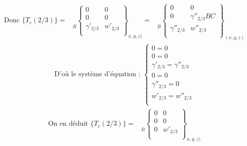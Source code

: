 \documentclass[12pt,a4paper]{report}
\begin{document}
\begin{align*}
\mbox{Donc }
\{ T_c (2/3) \} = 
\begin{array}{c}
	\\ \\ \\ 
\end{array} _B
\left\{
\begin{array}{cc}
	0 & 0 \\
	0 & 0 \\
	\gamma'_{2/3} & w'_{2/3} \\
\end{array}
\right\} _{x,y,z)} =
\begin{array}{c}
	\\ \\ \\ 
\end{array} _{B}
\left\{
\begin{array}{cc}
	0 & 0 \\
	0 & \gamma''_{2/3}BC \\
	\gamma''_{2/3} & w''_{2/3} \\
\end{array}
\right\} _{(x, y, z)}
\end{align*} 
\begin{align*}
\mbox{D'où le système d'équation : }
\left\{
\begin{array}{l}
0 = 0 \\
0 = 0 \\
\gamma'_{2/3} = \gamma''_{2/3} \\
0 = 0 \\
\gamma''_{2/3} = 0 \\
w'_{2/3} = w''_{2/3} \\
\end{array}
\right. 
\end{align*} 
\begin{align*}
\mbox{On en déduit } 
\{ T_c (2/3) \} = 
\begin{array}{c}
	\\ \\ \\ 
\end{array} _B
\left\{
\begin{array}{cc}
	0 & 0 \\
	0 & 0 \\
	0 & w'_{2/3} \\
\end{array}
\right\} _{x,y,z)}
\end{align*}
\end{document}
